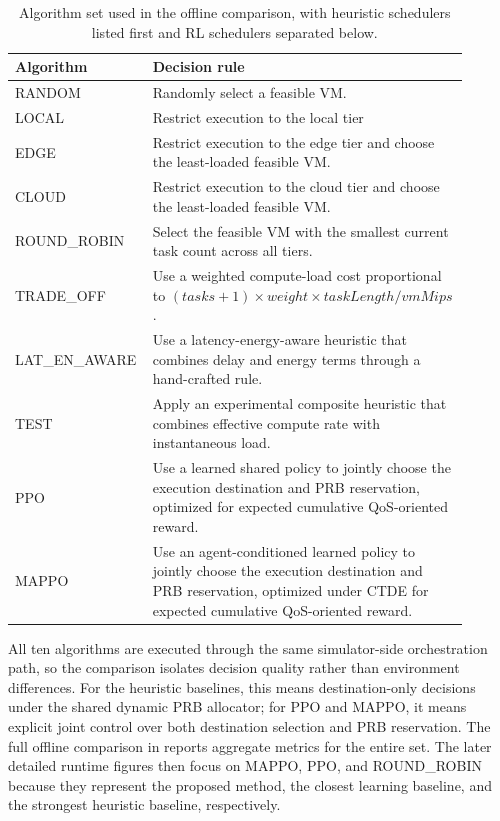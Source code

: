 \begin{table}[H]
    \centering
    \small
    \begin{tabular}{p{0.22\linewidth}p{0.68\linewidth}}
        \hline
        \textbf{Algorithm} & \textbf{Decision rule} \\
        \hline
        RANDOM & Randomly select a feasible VM. \\
        LOCAL & Restrict execution to the local tier \\
        EDGE & Restrict execution to the edge tier and choose the least-loaded feasible VM. \\
        CLOUD & Restrict execution to the cloud tier and choose the least-loaded feasible VM. \\
        ROUND\_ROBIN & Select the feasible VM with the smallest current task count across all tiers. \\
        TRADE\_OFF & Use a weighted compute-load cost proportional to \((tasks+1)\times weight \times taskLength / vmMips\). \\
        LAT\_EN\_AWARE & Use a latency-energy-aware heuristic that combines delay and energy terms through a hand-crafted rule. \\
        TEST & Apply an experimental composite heuristic that combines effective compute rate with instantaneous load. \\
        \hline
        PPO & Use a learned shared policy to jointly choose the execution destination and PRB reservation, optimized for expected cumulative QoS-oriented reward. \\
        MAPPO & Use an agent-conditioned learned policy to jointly choose the execution destination and PRB reservation, optimized under CTDE for expected cumulative QoS-oriented reward. \\
        \hline
    \end{tabular}
    \caption{Algorithm set used in the offline comparison, with heuristic schedulers listed first and RL schedulers separated below.}
    \label{tab:baseline-algorithms}
\end{table}

All ten algorithms are executed through the same simulator-side orchestration path, so the comparison isolates decision quality rather than environment differences. For the heuristic baselines, this means destination-only decisions under the shared dynamic PRB allocator; for PPO and MAPPO, it means explicit joint control over both destination selection and PRB reservation. The full offline comparison in  reports aggregate metrics for the entire set. The later detailed runtime figures then focus on MAPPO, PPO, and ROUND\_ROBIN because they represent the proposed method, the closest learning baseline, and the strongest heuristic baseline, respectively.
